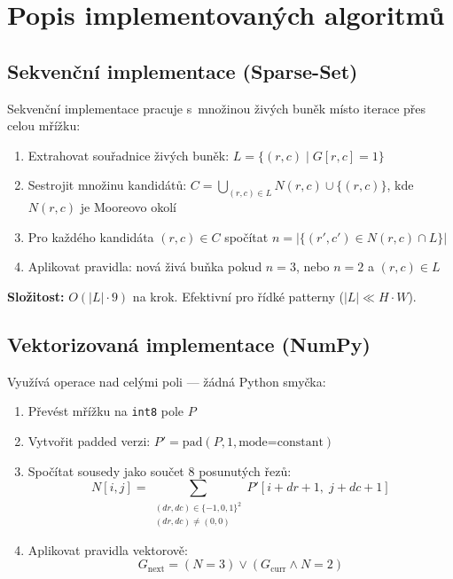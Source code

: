 \documentclass[12pt,a4paper]{article}
\begin{document}
\section{Popis implementovaných algoritmů}

\subsection{Sekvenční implementace (Sparse-Set)}

Sekvenční implementace pracuje s~množinou živých buněk místo iterace přes celou mřížku:

\begin{enumerate}
    \item Extrahovat souřadnice živých buněk: $L = \{(r,c) \mid G[r,c] = 1\}$
    \item Sestrojit množinu kandidátů: $C = \bigcup_{(r,c) \in L} N(r,c) \cup \{(r,c)\}$, kde $N(r,c)$ je Mooreovo okolí
    \item Pro každého kandidáta $(r,c) \in C$ spočítat $n = |\{(r',c') \in N(r,c) \cap L\}|$
    \item Aplikovat pravidla: nová živá buňka pokud $n=3$, nebo $n=2$ a $(r,c) \in L$
\end{enumerate}

\noindent\textbf{Složitost:} $O(|L| \cdot 9)$ na krok. Efektivní pro řídké patterny ($|L| \ll H \cdot W$).

\subsection{Vektorizovaná implementace (NumPy)}

Využívá operace nad celými poli --- žádná Python smyčka:

\begin{enumerate}
    \item Převést mřížku na \texttt{int8} pole $P$
    \item Vytvořit padded verzi: $P' = \mathrm{pad}(P, 1, \text{mode=constant})$
    \item Spočítat sousedy jako součet 8 posunutých řezů:
    \[
        N[i,j] = \sum_{\substack{(dr,dc) \in \{-1,0,1\}^2 \\ (dr,dc) \neq (0,0)}} P'[i{+}dr{+}1,\; j{+}dc{+}1]
    \]
    \item Aplikovat pravidla vektorově:
    \[
        G_{\text{next}} = (N = 3) \lor (G_{\text{curr}} \land N = 2)
    \]
\end{enumerate}
\end{document}
